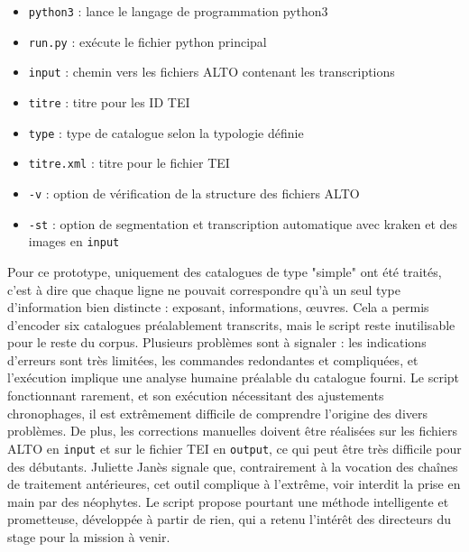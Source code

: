 \documentclass[a4paper,12pt,twoside]{book}
\begin{document}
\begin{itemize}
	\item \texttt{python3} : lance le langage de programmation python3
	\item \texttt{run.py} : exécute le fichier python principal 
	\item \texttt{input} : chemin vers les fichiers ALTO contenant les transcriptions
	\item \texttt{titre} : titre pour les ID TEI
	\item \texttt{type} : type de catalogue selon la typologie définie
	\item \texttt{titre.xml} : titre pour le fichier TEI
	\item \texttt{-v} : option de vérification de la structure des fichiers ALTO
	\item \texttt{-st} : option de segmentation et transcription automatique avec kraken et des images en \texttt{input} 
\end{itemize} 

Pour ce prototype, uniquement des catalogues de type "simple" ont été traités, c'est à dire que chaque ligne ne pouvait correspondre qu'à un seul type d'information bien distincte : exposant, informations, œuvres. Cela a permis d'encoder six catalogues préalablement transcrits, mais le script reste inutilisable pour le reste du corpus. Plusieurs problèmes sont à signaler : les indications d'erreurs sont très limitées, les commandes redondantes et compliquées, et l'exécution implique une analyse humaine préalable du catalogue fourni. Le script fonctionnant rarement, et son exécution nécessitant des ajustements chronophages, il est extrêmement difficile de comprendre l'origine des divers problèmes. De plus, les corrections manuelles doivent être réalisées sur les fichiers ALTO en \texttt{input} et sur le fichier TEI en \texttt{output}, ce qui peut être très difficile pour des débutants. Juliette Janès signale que, contrairement à la vocation des chaînes de traitement antérieures, cet outil complique à l'extrême, voir interdit la prise en main par des néophytes. Le script propose pourtant une méthode intelligente et  prometteuse, développée à partir de rien, qui a retenu l'intérêt des directeurs du stage pour la mission à venir. 
\end{document}
